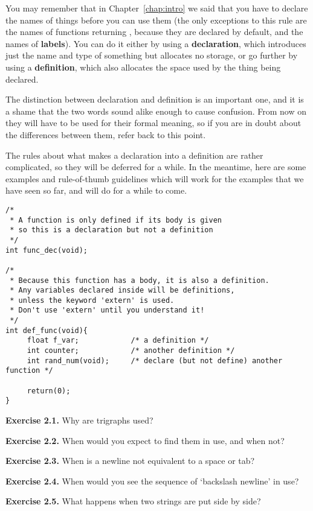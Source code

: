   

  You may remember that in Chapter~\ref{chap:intro} we said that you have to
   declare the names of things before you can use them (the only exceptions to
   this rule are the names of functions returning \kint, because
   they are declared by default, and the names of \textbf{labels}). You can
   do it either by using a \textbf{declaration}, which introduces just the
   name and type of something but allocates no storage, or go further by using
   a \textbf{definition}, which also allocates the space used by the thing
   being declared.


  The distinction between declaration and definition is an important one,
   and it is a shame that the two words sound alike enough to cause confusion.
   From now on they will have to be used for their formal meaning, so if you
   are in doubt about the differences between them, refer back to this
   point.


  The rules about what makes a declaration into a definition are rather
   complicated, so they will be deferred for a while. In the meantime, here
   are some examples and rule-of-thumb guidelines which will work for the
   examples that we have seen so far, and will do for a while to come.


  \begin{Verbatim}
/*
 * A function is only defined if its body is given
 * so this is a declaration but not a definition
 */
int func_dec(void);

/*
 * Because this function has a body, it is also a definition.
 * Any variables declared inside will be definitions,
 * unless the keyword 'extern' is used.
 * Don't use 'extern' until you understand it!
 */
int def_func(void){
     float f_var;            /* a definition */
     int counter;            /* another definition */
     int rand_num(void);     /* declare (but not define) another function */

     return(0);
}
\end{Verbatim}

  

   \textbf{Exercise 2.1.} Why are trigraphs used?


   \textbf{Exercise 2.2.} When would you expect to find them in use, and when
    not?


   \textbf{Exercise 2.3.} When is a newline not equivalent to a space or
    tab?


   \textbf{Exercise 2.4.} When would you see the sequence of `backslash
    newline' in use?


   \textbf{Exercise 2.5.} What happens when two strings are put side by
    side?


